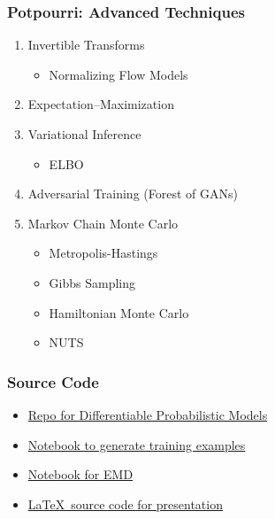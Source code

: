 \documentclass{beamer}
\begin{document}
\begin{frame}
  \frametitle{Potpourri: Advanced Techniques}
  \begin{enumerate}
    \item Invertible Transforms
      \begin{itemize}
        \item Normalizing Flow Models
      \end{itemize}
    \item Expectation–Maximization
    \item Variational Inference
      \begin{itemize}
        \item ELBO
      \end{itemize}
    \item Adversarial Training (Forest of GANs)
    \item Markov Chain Monte Carlo
    \begin{itemize}
      \item Metropolis-Hastings
      \item Gibbs Sampling
      \item Hamiltonian Monte Carlo
      \item NUTS
    \end{itemize}
  \end{enumerate}
\end{frame}

\begin{frame}
  \frametitle{Source Code}
  \begin{itemize}
    \item \href{https://github.com/nextBillyonair/DPM}{Repo for Differentiable Probabilistic Models}
    \item \href{https://github.com/nextBillyonair/DPM/blob/master/Notebooks/DivergencePresentationExamples.ipynb}{Notebook to generate training examples}
    \item \href{https://github.com/nextBillyonair/DPM/blob/master/Notebooks/EMD.ipynb}{Notebook for EMD}
    \item \href{https://github.com/nextBillyonair/DPM/blob/master/Presentations/divergences/presentation.tex}{\LaTeX \, source code for presentation}
  \end{itemize}
\end{frame}
\end{document}
